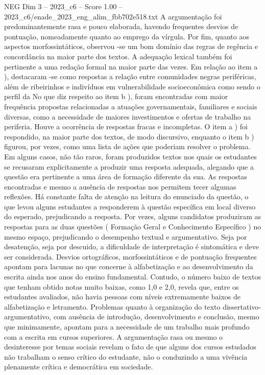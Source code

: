 \begin{textsample}{NEG Dim 3 – 2023\_c6 – Score 1.00 – 2023\_c6/enade\_2023\_eng\_alim\_fbb702e518.txt}
A argumentação foi predominantemente rasa e pouco elaborada, havendo frequentes desvios de pontuação, nomeadamente quanto ao emprego da vírgula.
Por fim, quanto aos aspectos morfossintáticos, observou -se um bom domínio das regras de regência e concordância na maior parte dos textos.
A adequação lexical também foi pertinente a uma redação formal na maior parte das vezes.
Em relação ao item a ), destacaram -se como respostas a relação entre comunidades negras periféricas, além de ribeirinhos e indivíduos em vulnerabilidade socioeconômica como sendo o perfil da No que diz respeito ao item b ), foram encontradas com maior frequência propostas relacionadas a atuações governamentais, familiares e sociais diversas, como a necessidade de maiores investimentos e ofertas de trabalho na periferia.
Houve a ocorrência de respostas fracas e incompletas.
O item a ) foi respondido, na maior parte dos textos, de modo discursivo, enquanto o item b ) figurou, por vezes, como uma lista de ações que poderiam resolver o problema.
Em alguns casos, não tão raros, foram produzidos textos nos quais os estudantes se recusaram explicitamente a produzir uma resposta adequada, alegando que a questão era pertinente a uma área de formação diferente da sua.
As respostas encontradas e mesmo a ausência de respostas nos permitem tecer algumas reflexões.
Há constante falta de atenção na leitura do enunciado da questão, o que levou alguns estudantes a responderem à questão específica em local diverso do esperado, prejudicando a resposta.
Por vezes, alguns candidatos produziram as respostas para as duas questões ( Formação Geral e Conhecimento Específico ) no mesmo espaço, prejudicando o desempenho textual e argumentativo.
Seja por desatenção, seja por descuido, a dificuldade de interpretação é sintomática e deve ser considerada.
Desvios ortográficos, morfossintáticos e de pontuação frequentes apontam para lacunas no que concerne à alfabetização e ao desenvolvimento da escrita ainda nos anos do ensino fundamental.
Contudo, o número baixo de textos que tenham obtido notas muito baixas, como 1,0 e 2,0, revela que, entre os estudantes avaliados, não havia pessoas com níveis extremamente baixos de alfabetização e letramento.
Problemas quanto à organização do texto dissertativo-argumentativo, com ausência de introdução, desenvolvimento e conclusão, mesmo que minimamente, apontam para a necessidade de um trabalho mais profundo com a escrita em cursos superiores.
A argumentação rasa ou mesmo o desinteresse por temas sociais revelam o fato de que alguns dos cursos estudados não trabalham o senso crítico do estudante, não o conduzindo a uma vivência plenamente crítica e democrática em sociedade.

\end{textsample}
